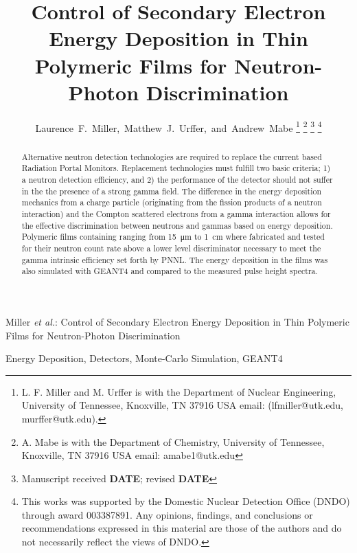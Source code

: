 \documentclass[draftcls,onecolumn]{IEEEtran}
\newcommand{\papertitle}{Control of Secondary Electron Energy Deposition in Thin Polymeric Films for Neutron-Photon Discrimination}
\begin{document}
\title{\papertitle}
\author{Laurence~F.~Miller,~Matthew~J.~Urffer,~and~Andrew~Mabe%
	\thanks{L. F. Miller and M. Urffer is with the Department of Nuclear Engineering, University of Tennessee, Knoxville, TN 37916 USA email: (lfmiller@utk.edu, murffer@utk.edu).}%
	\thanks{A. Mabe is with the Department of Chemistry, University of Tennessee, Knoxville, TN 37916 USA email: amabe1@utk.edu}%
	\thanks{Manuscript received \textbf{DATE}; revised \textbf{DATE}}%
	\thanks{This works was supported by the Domestic Nuclear Detection Office (DNDO) through award 003387891.
Any opinions, findings, and conclusions or recommendations expressed in this material are those of the authors and do not necessarily reflect the views of DNDO.}}

%
{Miller \MakeLowercase{\textit{et al.}}: \papertitle}

\maketitle
\begin{abstract}
Alternative neutron detection technologies are required to replace the current  based Radiation Portal Monitors.
Replacement technologies must fulfill two basic criteria; 1) a neutron detection efficiency, and 2) the performance of the detector should not suffer in the the presence of a strong gamma field.
The difference in the energy deposition mechanics from a charge particle (originating from the fission products of a neutron interaction) and the Compton scattered electrons from a gamma interaction allows for the effective discrimination between neutrons and gammas based on energy deposition.
Polymeric films containing  ranging from \SI{15}{\um} to \SI{1}{\cm} where fabricated and tested for their neutron count rate above a lower level discriminator necessary to meet the gamma intrinsic efficiency set forth by PNNL.
The energy deposition in the films was also simulated with GEANT4 and compared to the measured pulse height spectra.
\end{abstract}

\begin{IEEEkeywords}
Energy Deposition, Detectors, Monte-Carlo Simulation, GEANT4
\end{IEEEkeywords}

\IEEEpeerreviewmaketitle

\end{document}

